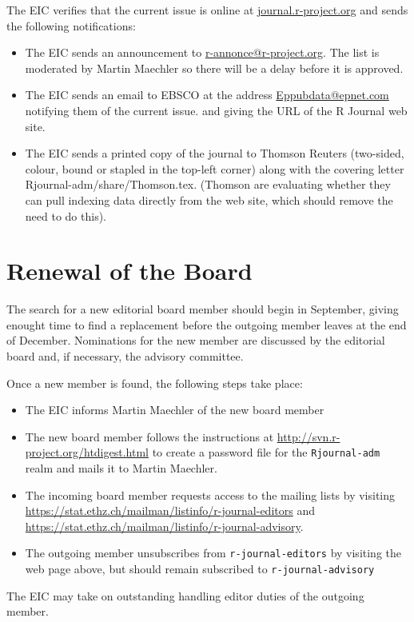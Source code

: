 \documentclass[11pt]{article}
\begin{document}
The EIC verifies that the current issue is online at
\url{journal.r-project.org} and sends the following notifications:
\begin{itemize}
\item The EIC sends an announcement to
  \url{r-annonce@r-project.org}. The list is moderated by Martin
  Maechler so there will be a delay before it is approved.
\item The EIC sends an email to EBSCO at the address 
  \url{Eppubdata@epnet.com} notifying them of the current issue.
  and giving the URL of the R Journal web site.
\item The EIC sends a printed copy of the journal to Thomson Reuters
  (two-sided, colour, bound or stapled in the top-left corner) along
  with the covering letter Rjournal-adm/share/Thomson.tex.
  (Thomson are evaluating whether they can pull indexing data directly
  from the web site, which should remove the need to do this).
\end{itemize}

\section{Renewal of the Board}

The search for a new editorial board member should begin in September,
giving enought time to find a replacement before the outgoing member
leaves at the end of December.  Nominations for the new member are
discussed by the editorial board and, if necessary, the advisory
committee.

Once a new member is found, the following steps take place:
\begin{itemize}
\item The EIC informs Martin Maechler of the new board member
\item The new board member follows the instructions at 
\url{http://svn.r-project.org/htdigest.html} to create a password file
for the \texttt{Rjournal-adm} realm and mails it to Martin Maechler.
\item The incoming board member requests access to the mailing lists by
visiting \url{https://stat.ethz.ch/mailman/listinfo/r-journal-editors}
and \url{https://stat.ethz.ch/mailman/listinfo/r-journal-advisory}.
\item The outgoing member unsubscribes from \texttt{r-journal-editors}
  by visiting the web page above, but should remain subscribed to
  \texttt{r-journal-advisory}
\end{itemize}
The EIC may take on outstanding handling editor duties of the outgoing
member.
\end{document}

